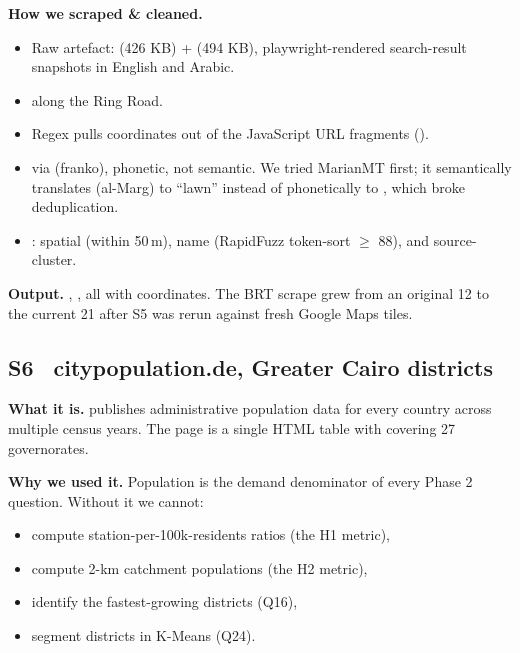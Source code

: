 \textbf{How we scraped \& cleaned.}
\begin{itemize}
 \item Raw artefact:  (426 KB)
 +  (494 KB), playwright-rendered
 search-result snapshots in English and Arabic.
 \item {} along the Ring Road.
 \item Regex pulls coordinates out of the JavaScript URL fragments
 ().
 \item {} via  (franko), phonetic,
 not semantic. We tried MarianMT first; it semantically translates
  (al-Marg) to ``lawn'' instead of phonetically to
 , which broke deduplication.
 \item {}: spatial (within 50\,m), name
 (RapidFuzz token-sort $\geq$ 88), and source-cluster.
\end{itemize}

\textbf{Output.} , , all with
coordinates. The BRT scrape grew from an original 12 to the current 21
after S5 was rerun against fresh Google Maps tiles.


\subsection{S6 \textbullet\ citypopulation.de, Greater Cairo districts}

\textbf{What it is.}  publishes administrative
population data for every country across multiple census years. The
 page is a single HTML table with 
covering 27 governorates.

\textbf{Why we used it.} Population is the demand denominator of every
Phase 2 question. Without it we cannot:
\begin{itemize}
 \item compute station-per-100k-residents ratios (the H1 metric),
 \item compute 2-km catchment populations (the H2 metric),
 \item identify the fastest-growing districts (Q16),
 \item segment districts in K-Means (Q24).
\end{itemize}

